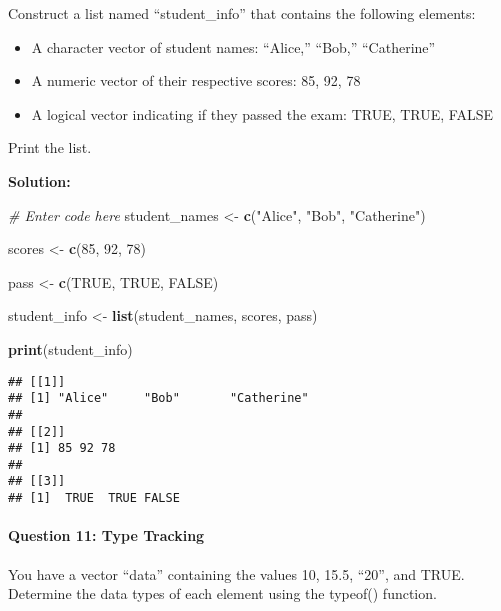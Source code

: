 \documentclass[
]{article}
\newenvironment{Shaded}{\begin{snugshade}}{\end{snugshade}}
\newcommand{\CommentTok}[1]{\textcolor[rgb]{0.56,0.35,0.01}{\textit{#1}}}
\newcommand{\ConstantTok}[1]{\textcolor[rgb]{0.56,0.35,0.01}{#1}}
\newcommand{\DecValTok}[1]{\textcolor[rgb]{0.00,0.00,0.81}{#1}}
\newcommand{\FunctionTok}[1]{\textcolor[rgb]{0.13,0.29,0.53}{\textbf{#1}}}
\newcommand{\NormalTok}[1]{#1}
\newcommand{\OtherTok}[1]{\textcolor[rgb]{0.56,0.35,0.01}{#1}}
\newcommand{\StringTok}[1]{\textcolor[rgb]{0.31,0.60,0.02}{#1}}
\begin{document}
Construct a list named ``student\_info'' that contains the following
elements:

\begin{itemize}
\item
  A character vector of student names: ``Alice,'' ``Bob,'' ``Catherine''
\item
  A numeric vector of their respective scores: 85, 92, 78
\item
  A logical vector indicating if they passed the exam: TRUE, TRUE, FALSE
\end{itemize}

Print the list.

\textbf{Solution:}

\begin{Shaded}
\begin{Highlighting}[]
\CommentTok{\# Enter code here}
\NormalTok{student\_names }\OtherTok{\textless{}{-}} \FunctionTok{c}\NormalTok{(}\StringTok{"Alice"}\NormalTok{, }\StringTok{"Bob"}\NormalTok{, }\StringTok{"Catherine"}\NormalTok{)}

\NormalTok{scores }\OtherTok{\textless{}{-}} \FunctionTok{c}\NormalTok{(}\DecValTok{85}\NormalTok{, }\DecValTok{92}\NormalTok{, }\DecValTok{78}\NormalTok{)}

\NormalTok{pass }\OtherTok{\textless{}{-}} \FunctionTok{c}\NormalTok{(}\ConstantTok{TRUE}\NormalTok{, }\ConstantTok{TRUE}\NormalTok{, }\ConstantTok{FALSE}\NormalTok{)}

\NormalTok{student\_info }\OtherTok{\textless{}{-}} \FunctionTok{list}\NormalTok{(student\_names, scores, pass)}

\FunctionTok{print}\NormalTok{(student\_info)}
\end{Highlighting}
\end{Shaded}

\begin{verbatim}
## [[1]]
## [1] "Alice"     "Bob"       "Catherine"
## 
## [[2]]
## [1] 85 92 78
## 
## [[3]]
## [1]  TRUE  TRUE FALSE
\end{verbatim}

\hypertarget{question-11-type-tracking}{%
\paragraph{Question 11: Type Tracking}\label{question-11-type-tracking}}

You have a vector ``data'' containing the values 10, 15.5, ``20'', and
TRUE. Determine the data types of each element using the typeof()
function.
\end{document}

